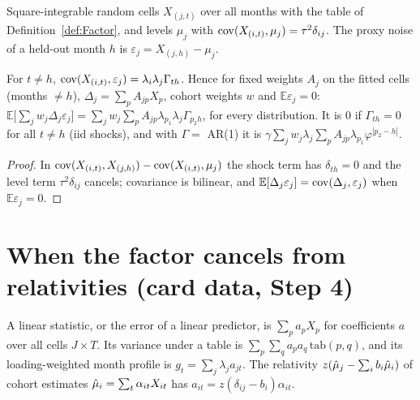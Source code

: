 \begin{definition}\label{def:Factor_HeldOut}
  \leanok
  Square-integrable random cells $X_{(j,t)}$ over all months with the table of
  Definition~\ref{def:Factor}, and levels $\mu_j$ with $\operatorname{cov}(X_{(i,t)}, \mu_j) = \tau^2\delta_{ij}$. The
  proxy noise of a held-out month $h$ is $\varepsilon_j = X_{(j,h)} - \mu_j$.
\end{definition}

\begin{theorem}\label{thm:Factor_heldOut_bias}
  \leanok
  For $t \ne h$, $\operatorname{cov}(X_{(i,t)}, \varepsilon_j) = \lambda_i\lambda_j\Gamma_{th}$. Hence for fixed weights
  $A_j$ on the fitted cells (months $\ne h$), $\Delta_j = \sum_p A_{jp}X_p$, cohort weights $w$ and
  $\mathbb E\varepsilon_j = 0$:
  $\mathbb E\bigl[\sum_j w_j\Delta_j\varepsilon_j\bigr] = \sum_j w_j\sum_p A_{jp}\lambda_{p_1}\lambda_j\Gamma_{p_2h}$,
  for every distribution. It is $0$ if $\Gamma_{th} = 0$ for all $t \ne h$ (iid shocks), and with
  $\Gamma = $ AR(1) it is $\gamma\sum_j w_j\lambda_j\sum_p A_{jp}\lambda_{p_1}\varphi^{|p_2 - h|}$.
\end{theorem}
\begin{proof}
  \leanok
  In $\operatorname{cov}(X_{(i,t)}, X_{(j,h)}) - \operatorname{cov}(X_{(i,t)}, \mu_j)$ the shock term has $\delta_{th} = 0$ and the
  level term $\tau^2\delta_{ij}$ cancels; covariance is bilinear, and $\mathbb E[\Delta_j\varepsilon_j]
  = \operatorname{cov}(\Delta_j, \varepsilon_j)$ when $\mathbb E\varepsilon_j = 0$.
\end{proof}

\section*{When the factor cancels from relativities (card data, Step 4)}

\begin{definition}\label{def:Factor_profile}
  \leanok
  A linear statistic, or the error of a linear predictor, is $\sum_p a_pX_p$ for coefficients
  $a$ over all cells $J \times T$. Its variance under a table is
  $\sum_p\sum_q a_pa_q\,\mathrm{tab}(p,q)$, and its loading-weighted month profile is
  $g_t = \sum_j \lambda_j a_{jt}$. The relativity $z(\hat\mu_j - \sum_i b_i\hat\mu_i)$ of cohort
  estimates $\hat\mu_i = \sum_t \alpha_{it}X_{it}$ has $a_{it} = z(\delta_{ij} - b_i)\alpha_{it}$.
\end{definition}

